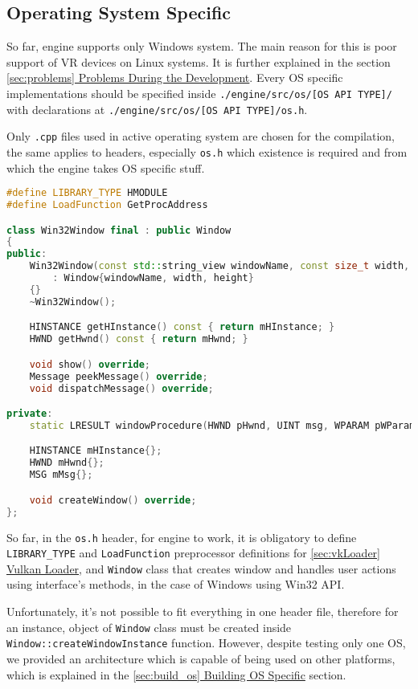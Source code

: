 \newpage
\subsection{Operating System Specific}
\label{sec:os}
\hspace{\parindent}
So far, engine supports only Windows system. The main reason for this is poor support of VR devices on Linux systems.
It is further explained in the section \hyperref[sec:problems]{\ref*{sec:problems} Problems During the Development}.
Every OS specific implementations should be specified inside \texttt{./engine/src/os/[OS API TYPE]/} with declarations at \texttt{./engine/src/os/[OS API TYPE]/os.h}.

Only \texttt{.cpp} files used in active operating system are chosen for the compilation, the same applies to headers, especially \texttt{os.h} which existence is required and from which the engine takes OS specific stuff.
\begin{lstlisting}[language=c++, caption=Windows OS Header (./engine/src/os/win32/os.h)]
#define LIBRARY_TYPE HMODULE
#define LoadFunction GetProcAddress

class Win32Window final : public Window
{
public:
    Win32Window(const std::string_view windowName, const size_t width, const size_t height)
        : Window{windowName, width, height}
    {}
    ~Win32Window();

    HINSTANCE getHInstance() const { return mHInstance; }
    HWND getHwnd() const { return mHwnd; }

    void show() override;
    Message peekMessage() override;
    void dispatchMessage() override;

private:
    static LRESULT windowProcedure(HWND pHwnd, UINT msg, WPARAM pWParam, LPARAM wLParam);

    HINSTANCE mHInstance{};
    HWND mHwnd{};
    MSG mMsg{};

    void createWindow() override;
};
\end{lstlisting}

So far, in the \texttt{os.h} header, for engine to work, it is obligatory to define \texttt{LIBRARY\_TYPE} and \texttt{LoadFunction} preprocessor definitions for \hyperref[sec:vkLoader]{\ref*{sec:vkLoader} Vulkan Loader}, and \texttt{Window} class that creates window and handles user actions using interface's methods, in the case of Windows using Win32 API.

Unfortunately, it's not possible to fit everything in one header file, therefore for an instance, object of \texttt{Window} class must be created inside 
\texttt{Window::createWindowInstance} function.
However, despite testing only one OS, we provided an architecture which is capable of being used on other platforms, which is explained in the
\hyperref[sec:build_os]{\ref*{sec:build_os} Building OS Specific} section.